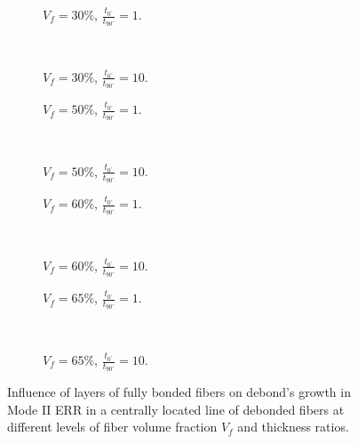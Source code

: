 \documentclass[review]{elsarticle}
\begin{document}
\begin{figure}[!h]
\centering
   \begin{subfigure}[b]{0.45\textwidth}
        \caption{$V_{f}=30\%$, $\frac{t_{0^{\circ}}}{t_{90^{\circ}}}=1$.}\label{subfig:abovefiber30MIIthick1}
    \end{subfigure} ~
    \begin{subfigure}[b]{0.45\textwidth}
         \caption{$V_{f}=30\%$, $\frac{t_{0^{\circ}}}{t_{90^{\circ}}}=10$.}\label{subfig:abovefiber30MIIthick10}
    \end{subfigure}

   \begin{subfigure}[b]{0.45\textwidth}
        \caption{$V_{f}=50\%$, $\frac{t_{0^{\circ}}}{t_{90^{\circ}}}=1$.}\label{subfig:abovefiber50MIIthick1}
    \end{subfigure} ~
    \begin{subfigure}[b]{0.45\textwidth}
         \caption{$V_{f}=50\%$, $\frac{t_{0^{\circ}}}{t_{90^{\circ}}}=10$.}\label{subfig:abovefiber50MIIthick10}
    \end{subfigure}

    \begin{subfigure}[b]{0.45\textwidth}
        \caption{$V_{f}=60\%$, $\frac{t_{0^{\circ}}}{t_{90^{\circ}}}=1$.}\label{subfig:abovefiber60MIIthick1}
    \end{subfigure} ~
    \begin{subfigure}[b]{0.45\textwidth}
        \caption{$V_{f}=60\%$, $\frac{t_{0^{\circ}}}{t_{90^{\circ}}}=10$.}\label{subfig:abovefiber60MIIthick10}
    \end{subfigure}

    \begin{subfigure}[b]{0.45\textwidth}
        \caption{$V_{f}=65\%$, $\frac{t_{0^{\circ}}}{t_{90^{\circ}}}=1$.}\label{subfig:abovefiber65MIIthick1}
    \end{subfigure} ~
    \begin{subfigure}[b]{0.45\textwidth}
        \caption{$V_{f}=65\%$, $\frac{t_{0^{\circ}}}{t_{90^{\circ}}}=10$.}\label{subfig:abovefiber65MIIthick10}
    \end{subfigure}

\caption{Influence of layers of fully bonded fibers on debond's growth in Mode II ERR in a centrally located line of debonded fibers at different levels of fiber volume fraction $V_{f}$ and thickness ratios.}\label{fig:abovefibersMII}
\end{figure}
\end{document}
